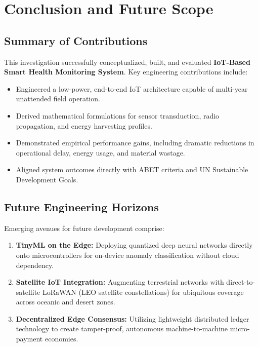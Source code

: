 \section{Conclusion and Future Scope}

\subsection{Summary of Contributions}
This investigation successfully conceptualized, built, and evaluated \textbf{IoT-Based Smart Health Monitoring System}. Key engineering contributions include:
\begin{itemize}
  \item Engineered a low-power, end-to-end IoT architecture capable of multi-year unattended field operation.
  \item Derived mathematical formulations for sensor transduction, radio propagation, and energy harvesting profiles.
  \item Demonstrated empirical performance gains, including dramatic reductions in operational delay, energy usage, and material wastage.
  \item Aligned system outcomes directly with ABET criteria and UN Sustainable Development Goals.
\end{itemize}

\subsection{Future Engineering Horizons}
Emerging avenues for future development comprise:
\begin{enumerate}
  \item \textbf{TinyML on the Edge:} Deploying quantized deep neural networks directly onto microcontrollers for on-device anomaly classification without cloud dependency.
  \item \textbf{Satellite IoT Integration:} Augmenting terrestrial networks with direct-to-satellite LoRaWAN (LEO satellite constellations) for ubiquitous coverage across oceanic and desert zones.
  \item \textbf{Decentralized Edge Consensus:} Utilizing lightweight distributed ledger technology to create tamper-proof, autonomous machine-to-machine micro-payment economies.
\end{enumerate}
